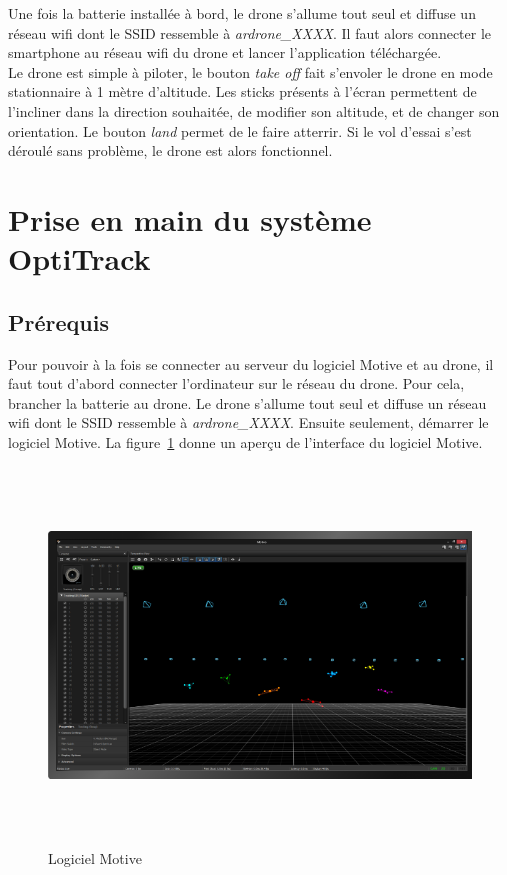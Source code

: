             Une fois la batterie installée à bord, le drone s'allume tout seul et diffuse un réseau wifi dont le SSID ressemble à \textit{ardrone\_XXXX}. Il faut alors connecter le smartphone au réseau wifi du drone et lancer l'application téléchargée. \\

            Le drone est simple à piloter, le bouton \textit{take off} fait s'envoler le drone en mode stationnaire à 1 mètre d'altitude. Les sticks présents à l'écran permettent de l'incliner dans la direction souhaitée, de modifier son altitude, et de changer son orientation. Le bouton \textit{land} permet de le faire atterrir. Si le vol d'essai s'est déroulé sans problème, le drone est alors fonctionnel.


    \section{Prise en main du système OptiTrack}
    \label{sec:prise_en_main_du_systeme_optitrack}
        \subsection{Prérequis}
            Pour pouvoir à la fois se connecter au serveur du logiciel Motive et au drone, il faut tout d'abord connecter l'ordinateur sur le réseau du drone. Pour cela, brancher la batterie au drone. Le drone s'allume tout seul et diffuse un réseau wifi dont le SSID ressemble à \textit{ardrone\_XXXX}. Ensuite seulement, démarrer le logiciel Motive. La figure~\ref{fig:motive} donne un aperçu de l'interface du logiciel Motive.

            \begin{figure}[h]
              \centering
              \includegraphics[height=10cm]{images/motive.png}
              \caption{Logiciel Motive}
              \label{fig:motive}
            \end{figure}

